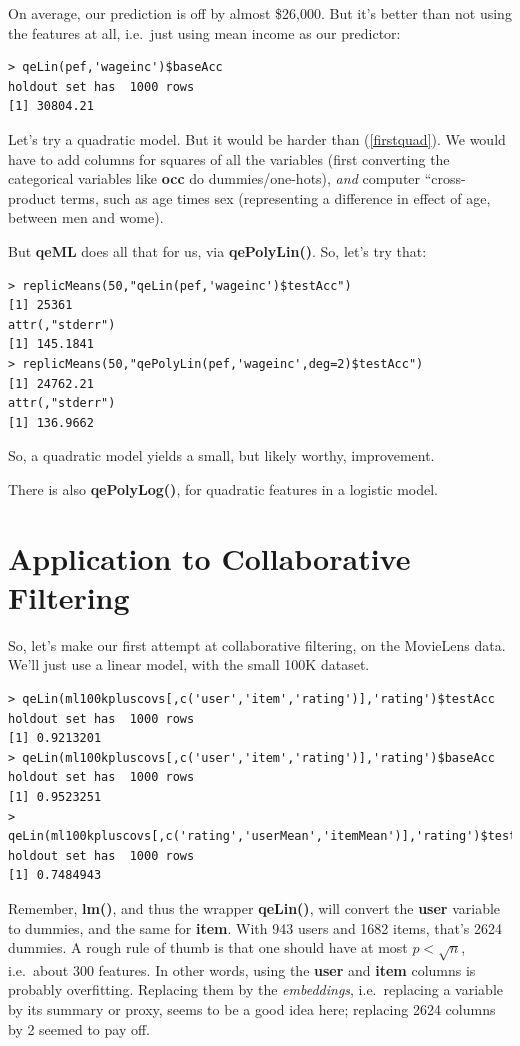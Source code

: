 On average, our prediction is off by almost \$26,000.  But it's better
than not using the features at all, i.e.\ just using mean income as our
predictor:

\begin{lstlisting}
> qeLin(pef,'wageinc')$baseAcc
holdout set has  1000 rows
[1] 30804.21
\end{lstlisting}

Let's try a quadratic model.  But it would be harder than
(\ref{firstquad}).  We would have to add columns for squares of all the 
variables (first converting the categorical variables like \textbf{occ} 
do dummies/one-hots), \textit{and} computer ``cross-product terms, such
as age times sex (representing a difference in effect of age, between
men and wome).

But \textbf{qeML} does all that for us, via \textbf{qePolyLin()}.  So,
let's try that:

\begin{lstlisting}
> replicMeans(50,"qeLin(pef,'wageinc')$testAcc")
[1] 25361
attr(,"stderr")
[1] 145.1841
> replicMeans(50,"qePolyLin(pef,'wageinc',deg=2)$testAcc")
[1] 24762.21
attr(,"stderr")
[1] 136.9662
\end{lstlisting}

So, a quadratic model yields a small, but likely worthy, improvement.

There is also \textbf{qePolyLog()}, for quadratic features in a logistic
model.

\section{Application to Collaborative Filtering}

So, let's make our first attempt at collaborative filtering, on the
MovieLens data.  We'll just use a linear model, with the small 100K
dataset.

\begin{lstlisting}
> qeLin(ml100kpluscovs[,c('user','item','rating')],'rating')$testAcc
holdout set has  1000 rows
[1] 0.9213201
> qeLin(ml100kpluscovs[,c('user','item','rating')],'rating')$baseAcc
holdout set has  1000 rows
[1] 0.9523251
> qeLin(ml100kpluscovs[,c('rating','userMean','itemMean')],'rating')$testAcc
holdout set has  1000 rows
[1] 0.7484943
\end{lstlisting}

Remember, \textbf{lm()}, and thus the wrapper \textbf{qeLin()}, will
convert the \textbf{user} variable to dummies, and the same for
\textbf{item}.  With 943 users and 1682 items, that's 2624 dummies.
A rough rule of thumb is that one should have at most $p < \sqrt{n}$, i.e.\
about 300 features.  In other words, using the \textbf{user} and
\textbf{item} columns is probably overfitting.  Replacing them by the
\textit{embeddings}, i.e.\ replacing a variable by its summary or proxy,
seems to be a good idea here; replacing 2624 columns by 2 seemed to pay
off.

